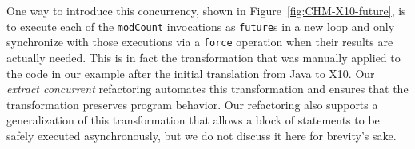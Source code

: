 One way to introduce this concurrency, shown in Figure~\ref{fig:CHM-X10-future},
is to execute each of the {\tt modCount} invocations as {\tt future}s in a new loop
and only synchronize with those executions via a {\tt force}
operation when their results are actually needed.
This is in fact the transformation that was manually applied to
the code in our example after the initial translation
from Java to X10.  Our
{\em extract concurrent} refactoring automates this transformation and
ensures that the transformation preserves program behavior.  Our
refactoring also supports a generalization of this transformation that
allows a block of statements to be safely executed asynchronously,
but we do not discuss it here for brevity's sake.





